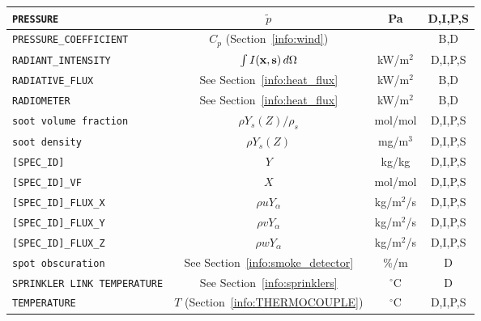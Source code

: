 \documentclass[11pt]{book}
\newcommand{\ct}{\tt\small}
\newcommand{\bx}{{\bf x}}
\newcommand{\bs}{{\bf s}}
\newcommand{\tp}{\tilde{p}}
\begin{document}
\begin{table}[h!]
\begin{center}
\begin{tabular}{|l|c|c|c|}
{\ct PRESSURE}                                  & $\tp$                                         & Pa             & D,I,P,S      \\ \hline
{\ct PRESSURE\_COEFFICIENT}                     & $C_p$ (Section~\ref{info:wind})               &                & B,D          \\ \hline
{\ct RADIANT\_INTENSITY}                        & $\int I(\bx,\bs)\, d\Omega$                   & kW/m$^2$       & D,I,P,S      \\ \hline
{\ct RADIATIVE\_FLUX}                           & See Section~\ref{info:heat_flux}              & kW/m$^2$       & B,D          \\ \hline
{\ct RADIOMETER}                                & See Section~\ref{info:heat_flux}              & kW/m$^2$       & B,D          \\ \hline
{\ct soot volume fraction}                      & $\rho Y_s(Z)/\rho_s$                          & mol/mol        & D,I,P,S      \\ \hline
{\ct soot density}                              & $\rho Y_s(Z)$                                 & mg/m$^3$       & D,I,P,S      \\ \hline
{\ct [SPEC\_ID]}                                & $Y$                                           & kg/kg          & D,I,P,S      \\ \hline
{\ct [SPEC\_ID]\_VF}                            & $X$                                           & mol/mol        & D,I,P,S      \\ \hline
{\ct [SPEC\_ID]\_FLUX\_X}                       & $\rho u Y_\alpha$                             & kg/m$^2$/s     & D,I,P,S      \\ \hline
{\ct [SPEC\_ID]\_FLUX\_Y}                       & $\rho v Y_\alpha$                             & kg/m$^2$/s     & D,I,P,S      \\ \hline
{\ct [SPEC\_ID]\_FLUX\_Z}                       & $\rho w Y_\alpha$                             & kg/m$^2$/s     & D,I,P,S      \\ \hline
{\ct spot obscuration}                          & See Section~\ref{info:smoke_detector}         & \%/m           & D            \\ \hline
{\ct SPRINKLER LINK TEMPERATURE}                & See Section~\ref{info:sprinklers}             & $^\circ$C      & D            \\ \hline
{\ct TEMPERATURE}                               & $T$ (Section~\ref{info:THERMOCOUPLE})         & $^\circ$C      & D,I,P,S      \\ \hline

\end{tabular}
\end{center}
\end{table}
\end{document}
